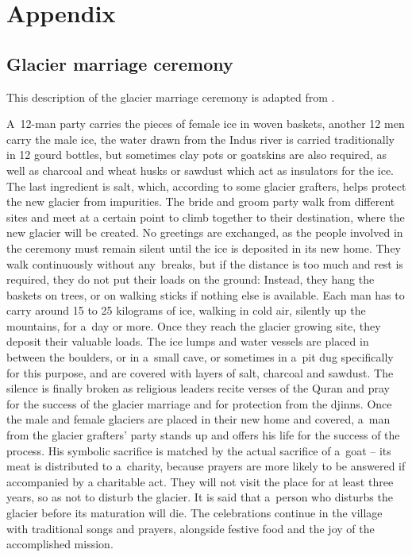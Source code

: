 %
\chapter{Appendix}
\label{sec:appendix}

\section{Glacier marriage ceremony}
\label{sec:glacier_marriage}

This description of the glacier marriage ceremony is adapted from \citet{khanMarriageGlaciersPrzekroj2020}.

A 12-man party carries the pieces of female ice in woven baskets, another 12 men carry the male ice, the water
drawn from the Indus river is carried traditionally in 12 gourd bottles, but sometimes clay pots or goatskins
are also required, as well as charcoal and wheat husks or sawdust which act as insulators for the ice. The last
ingredient is salt, which, according to some glacier grafters, helps protect the new glacier from impurities.
The bride and groom party walk from different sites and meet at a certain point to climb together to their
destination, where the new glacier will be created. No greetings are exchanged, as the people involved in the
ceremony must remain silent until the ice is deposited in its new home. They walk continuously without
any breaks, but if the distance is too much and rest is required, they do not put their loads on the ground:
Instead, they hang the baskets on trees, or on walking sticks if nothing else is available. Each man has to
carry around 15 to 25 kilograms of ice, walking in cold air, silently up the mountains, for a day or more. Once
they reach the glacier growing site, they deposit their valuable loads. The ice lumps and water vessels are
placed in between the boulders, or in a small cave, or sometimes in a pit dug specifically for this purpose, and
are covered with layers of salt, charcoal and sawdust. The silence is finally broken as religious leaders recite
verses of the Quran and pray for the success of the glacier marriage and for protection from the djinns. Once
the male and female glaciers are placed in their new home and covered, a man from the glacier grafters' party
stands up and offers his life for the success of the process. His symbolic sacrifice is matched by the actual
sacrifice of a goat – its meat is distributed to a charity, because prayers are more likely to be answered if
accompanied by a charitable act. They will not visit the place for at least three years, so as not to disturb
the glacier. It is said that a person who disturbs the glacier before its maturation will die. The celebrations
continue in the village with traditional songs and prayers, alongside festive food and the joy of the
accomplished mission.


